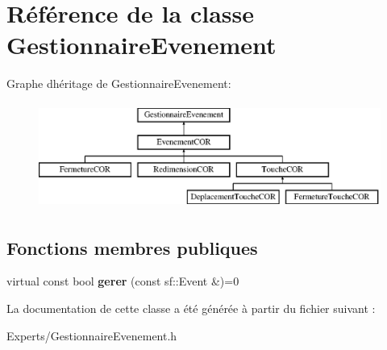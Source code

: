 \hypertarget{class_gestionnaire_evenement}{}\section{Référence de la classe Gestionnaire\+Evenement}
\label{class_gestionnaire_evenement}
Graphe d\textquotesingle{}héritage de Gestionnaire\+Evenement\+:\begin{figure}[H]
\begin{center}
\leavevmode
\includegraphics[height=3.456790cm]{class_gestionnaire_evenement}
\end{center}
\end{figure}
\subsection*{Fonctions membres publiques}
\begin{DoxyCompactItemize}
\item 
\mbox{\label{class_gestionnaire_evenement_af3dd4acdfe361172b7a30f3e9ac4b324}} 
virtual const bool {\bfseries gerer} (const sf\+::\+Event \&)=0
\end{DoxyCompactItemize}


La documentation de cette classe a été générée à partir du fichier suivant \+:\begin{DoxyCompactItemize}
\item 
Experts/Gestionnaire\+Evenement.\+h\end{DoxyCompactItemize}
